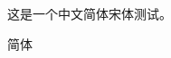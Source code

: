 \documentclass[a4paper]{article}
\newcommand{\cntext}[1]{\begin{CJK}{UTF8}{gbsn}#1\end{CJK}}
\begin{document}
\cntext{
这是一个中文简体宋体测试。
}
\begin{CJK}{UTF8}{gbsn}
简体
\end{CJK}
\end{document}
